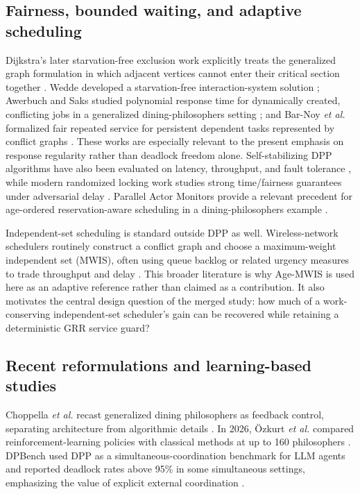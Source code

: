 \documentclass[10pt,journal]{IEEEtran}
\begin{document}
\subsection{Fairness, bounded waiting, and adaptive scheduling}
Dijkstra's later starvation-free exclusion work explicitly treats the generalized graph formulation in which adjacent vertices cannot enter their critical section together \cite{dijkstra1977}. Wedde developed a starvation-free interaction-system solution \cite{wedde1981}; Awerbuch and Saks studied polynomial response time for dynamically created, conflicting jobs in a generalized dining-philosophers setting \cite{awerbuch1990}; and Bar-Noy \emph{et al.} formalized fair repeated service for persistent dependent tasks represented by conflict graphs \cite{barnoy1998}. These works are especially relevant to the present emphasis on response regularity rather than deadlock freedom alone. Self-stabilizing DPP algorithms have also been evaluated on latency, throughput, and fault tolerance \cite{adamek2017}, while modern randomized locking work studies strong time/fairness guarantees under adversarial delay \cite{bendavid2025}. Parallel Actor Monitors provide a relevant precedent for age-ordered reservation-aware scheduling in a dining-philosophers example \cite{scholliers2014}.

Independent-set scheduling is standard outside DPP as well. Wireless-network schedulers routinely construct a conflict graph and choose a maximum-weight independent set (MWIS), often using queue backlog or related urgency measures to trade throughput and delay \cite{paschalidis2015}. This broader literature is why Age-MWIS is used here as an adaptive reference rather than claimed as a contribution. It also motivates the central design question of the merged study: how much of a work-conserving independent-set scheduler's gain can be recovered while retaining a deterministic GRR service guard?

\subsection{Recent reformulations and learning-based studies}
Choppella \emph{et al.} recast generalized dining philosophers as feedback control, separating architecture from algorithmic details \cite{choppella2020}. In 2026, {\"O}zkurt \emph{et al.} compared reinforcement-learning policies with classical methods at up to 160 philosophers \cite{ozkurt2026}. DPBench used DPP as a simultaneous-coordination benchmark for LLM agents and reported deadlock rates above 95\% in some simultaneous settings, emphasizing the value of explicit external coordination \cite{hasan2026}.
\end{document}
